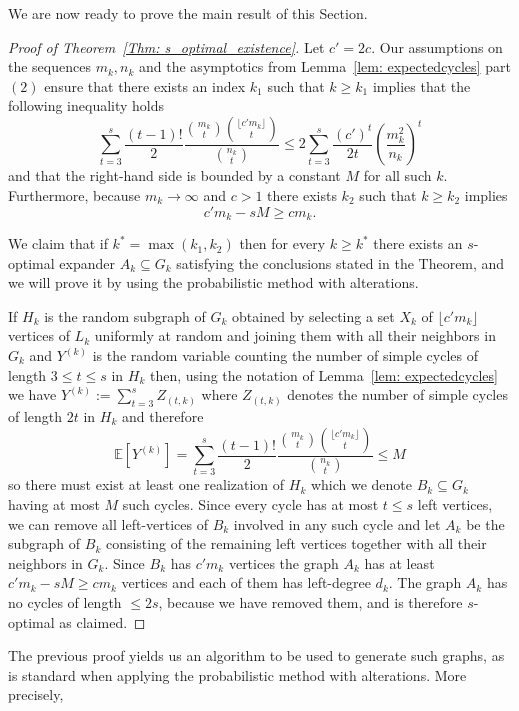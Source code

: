 \documentclass[12pt]{amsart}
\theoremstyle{definition}
\renewcommand{\geq}{\geqslant}
\renewcommand{\leq}{\leqslant}
\newcommand{\EE}{\ensuremath{\mathbb{E}}}
\newcommand{\1}{\ensuremath{\mathbb{1}}}
\begin{document}
We are now ready to prove the main result of this Section.

\begin{proof}[Proof of Theorem~\ref{Thm: s_optimal_existence}] Let $c'=2c$. Our assumptions on the sequences $m_k,n_k$ and the asymptotics from Lemma~\ref{lem: expectedcycles} part $(2)$ ensure that there exists an index $k_1$ such that $k\geq k_1$ implies that the following inequality holds
\[\sum_{t=3}^s\frac{(t-1)!}{2}\frac{\binom{m_k}{t}\binom{\lfloor c'm_k\rfloor}{t}}{\binom{n_k}{t}}\leq 2\sum_{t=3}^s \frac{(c')^t}{2t}\left(\frac{m_k^2}{n_k}\right)^t\]
and that the right-hand side is bounded by a constant $M$ for all such $k$. Furthermore, because $m_k\rightarrow \infty$ and $c>1$ there exists $k_2$ such that $k\geq k_2$ implies 
\[c'm_k-sM\geq cm_k.\] 

We claim that if $k^*=\max(k_1,k_2)$ then for every $k\geq k^*$ there exists an $s$-optimal expander $A_k\subseteq G_k$ satisfying the conclusions stated in the Theorem, and we will prove it by using the probabilistic method with alterations. 

If $H_k$ is the random subgraph of $G_k$ obtained by selecting a set $X_k$ of $\lfloor c'm_k\rfloor$ vertices of $L_k$ uniformly at random and joining them with all their neighbors in $G_k$ and $Y^{(k)}$ is the random variable counting the number of simple cycles of length $3\leq t\leq s$ in $H_k$ then, using the notation of Lemma~\ref{lem: expectedcycles} we have $Y^{(k)}:=\sum_{t=3}^s Z_{(t,k)}$ where $Z_{(t,k)}$ denotes the number of simple cycles of length $2t$ in $H_k$ and therefore 
\[\EE[Y^{(k)}]=\sum_{t=3}^s\frac{(t-1)!}{2}\frac{\binom{m_k}{t}\binom{\lfloor c'm_k\rfloor}{t}}{\binom{n_k}{t}}\leq M\]
so there must exist at least one realization of $H_k$ which we denote $B_k\subseteq G_k$ having at most $M$ such cycles. Since every cycle has at most $t\leq s$ left vertices, we can remove all left-vertices of $B_k$ involved in any such cycle and let $A_k$ be the subgraph of $B_k$ consisting of the remaining left vertices together with all their neighbors in $G_k$. 
Since $B_k$ has $c'm_k$ vertices the graph $A_k$ has at least $c'm_k-sM\geq cm_k$ vertices and each of them has left-degree $d_k$. The graph $A_k$ has no cycles of length $\leq 2s$, because we have removed them, and is therefore $s$-optimal as claimed.
\end{proof}

The previous proof yields us an algorithm to be used to generate such graphs, as is standard when applying the probabilistic method with alterations. More precisely,
\end{document}
